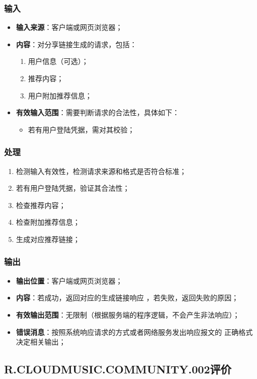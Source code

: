 \subsubsection{输入}
	\begin{itemize}
		\item \textbf{输入来源}：客户端或网页浏览器；
		\item \textbf{内容}：对分享链接生成的请求，包括：
		\begin{enumerate}
			\item 用户信息（可选）；
			\item 推荐内容；
			\item 用户附加推荐信息；
		\end{enumerate}
		\item \textbf{有效输入范围}：需要判断请求的合法性，具体如下：
		\begin{itemize}
			\item 若有用户登陆凭据，需对其校验； 
		\end{itemize}
	\end{itemize}
\subsubsection{处理}
	\begin{enumerate}
		\item 检测输入有效性，检测请求来源和格式是否符合标准；
		\item 若有用户登陆凭据，验证其合法性；
		\item 检查推荐内容；
		\item 检查附加推荐信息；
		\item 生成对应推荐链接；
	\end{enumerate}
\subsubsection{输出}
\begin{itemize}
	\item \textbf{输出位置}：客户端或网页浏览器；
	\item \textbf{内容}：若成功，返回对应的生成链接响应 ，若失败，返回失败的原因；
	\item \textbf{有效输出范围}：无限制（根据服务端的程序逻辑，不会产生非法响应）；
	\item \textbf{错误消息}：按照系统响应请求的方式或者网络服务发出响应报文的
		正确格式决定相关输出；
\end{itemize}

\subsection{R.CLOUDMUSIC.COMMUNITY.002评价}
